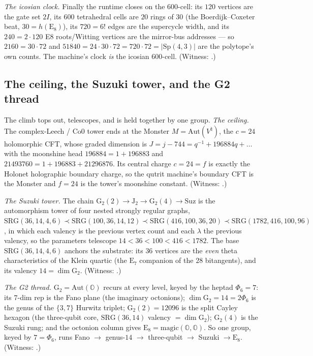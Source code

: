 \documentclass[11pt]{article}
\begin{document}
\emph{The icosian clock.} Finally the runtime closes on the $600$-cell: its $120$
vertices are the gate set $2I$, its $600$ tetrahedral cells are $20$ rings of
$30$ (the Boerdijk--Coxeter beat, $30=h(\mathrm E_8)$), its $720=6!$ edges are
the supercycle width, and its $240=2\cdot120$ E8 roots/Witting vertices are the
mirror-bus addresses --- so $2160=30\cdot72$ and $51840=24\cdot30\cdot72=
720\cdot72=|\mathrm{Sp}(4,3)|$ are the polytope's own counts. The machine's clock
\emph{is} the icosian $600$-cell. (Witness:
.)

\subsection{The ceiling, the Suzuki tower, and the G2 thread}

The climb tops out, telescopes, and is held together by one group. \emph{The
ceiling.} The complex-Leech / Co0 tower ends at the Monster $M=\mathrm{Aut}(V^\natural)$,
the $c=24$ holomorphic CFT, whose graded dimension is $J=j-744=q^{-1}+196884q+
\dots$ with the moonshine head $196884=1+196883$ and $21493760=1+196883+21296876$.
Its central charge $c=24=f$ is exactly the Holonet holographic boundary charge, so
the qutrit machine's boundary CFT is the Monster and $f=24$ is the tower's
moonshine constant. (Witness: .)

\emph{The Suzuki tower.} The chain $\mathrm G_2(2)\to\mathrm J_2\to\mathrm G_2(4)
\to\mathrm{Suz}$ is the automorphism tower of four nested strongly regular graphs,
$\mathrm{SRG}(36,14,4,6)\prec\mathrm{SRG}(100,36,14,12)\prec\mathrm{SRG}(416,100,
36,20)\prec\mathrm{SRG}(1782,416,100,96)$, in which each valency is the previous
vertex count and each $\lambda$ the previous valency, so the parameters telescope
$14<36<100<416<1782$. The base $\mathrm{SRG}(36,14,4,6)$ anchors the substrate:
its $36$ vertices are the \emph{even} theta characteristics of the Klein quartic
(the $\mathrm E_7$ companion of the $28$ bitangents), and its valency
$14=\dim\mathrm G_2$. (Witness: .)

\emph{The G2 thread.} $\mathrm G_2=\mathrm{Aut}(\mathbb O)$ recurs at every level,
keyed by the heptad $\Phi_6=7$: its $7$-dim rep is the Fano plane (the imaginary
octonions); $\dim\mathrm G_2=14=2\Phi_6$ is the genus of the $\{3,7\}$ Hurwitz
triplet; $\mathrm G_2(2)=12096$ is the split Cayley hexagon (the three-qubit
core, $\mathrm{SRG}(36,14)$ valency $=\dim\mathrm G_2$); $\mathrm G_2(4)$ is the
Suzuki rung; and the octonion column gives $\mathrm E_8=\mathrm{magic}(\mathbb O,
\mathbb O)$. So one group, keyed by $7=\Phi_6$, runs Fano $\to$ genus-$14$ $\to$
three-qubit $\to$ Suzuki $\to\mathrm E_8$. (Witness:
.)
\end{document}
